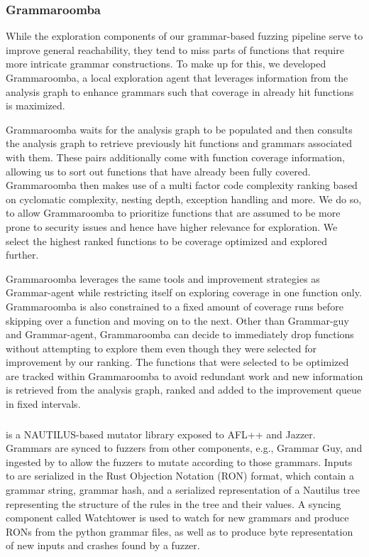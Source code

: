 \subsubsection{Grammaroomba}

While the exploration components of our grammar-based fuzzing pipeline serve to improve general reachability, they tend to miss parts of functions that require more intricate grammar constructions. 
To make up for this, we developed Grammaroomba, a local exploration agent that leverages information from the analysis graph to enhance grammars such that coverage in already hit functions is maximized.

Grammaroomba waits for the analysis graph to be populated and then consults the analysis graph to retrieve previously hit functions and grammars associated with them. These pairs additionally come with function coverage information, allowing us to sort out functions that have already been fully covered. Grammaroomba then makes use of a multi factor code complexity ranking based on cyclomatic complexity, nesting depth, exception handling and more. We do so, to allow Grammaroomba to prioritize functions that are assumed to be more prone to security issues and hence have higher relevance for exploration. We select the highest ranked functions to be coverage optimized and explored further.

Grammaroomba leverages the same tools and improvement strategies as Grammar-agent while restricting itself on exploring coverage in one function only. Grammaroomba is also constrained to a fixed amount of coverage runs before skipping over a function and moving on to the next. Other than Grammar-guy and Grammar-agent, Grammaroomba can decide to immediately drop functions without attempting to explore them even though they were selected for improvement by our ranking. The functions that were selected to be optimized are tracked within Grammaroomba to avoid redundant work and new information is retrieved from the analysis graph, ranked and added to the improvement queue in fixed intervals. 

\subsubsection{\revolver}

\revolver is a NAUTILUS-based mutator library exposed to AFL++ and Jazzer. Grammars are synced to fuzzers from other components, e.g., Grammar Guy, and ingested by \revolver to allow the fuzzers to mutate according to those grammars. Inputs to \revolver are serialized in the Rust Objection Notation (RON) format, which contain a grammar string, grammar hash, and a serialized representation of a Nautilus tree representing the structure of the rules in the tree and their values. A syncing component called Watchtower is used to watch for new grammars and produce RONs from the python grammar files, as well as to produce byte representation of new inputs and crashes found by a fuzzer. 